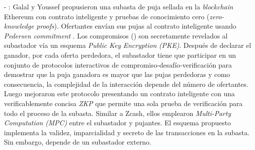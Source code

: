     - \cite{galalyusef2018a}: Galal y Youssef propusieron una subasta de puja sellada en la \textit{blockchain} Ethereum con contrato 
    inteligente y pruebas de conocimiento cero (\textit{zero-knowledge proofs}). Ofertantes envían sus pujas al contrato inteligente usando
    \textit{Pedersen commitment} \parencite{pedersen1991}. Los compromisos () son secretamente revelados al subastador vía
    un esquema \textit{Public Key Encryption (PKE)}. Después de declarar el ganador, por cada oferta perdedora, el subastador tiene que
    participar en un conjunto de protocolos interactivos de compromiso-desafío-verificación para demostrar que la puja ganadora es mayor que 
    las pujas perdedoras y como consecuencia, la complejidad de la interacción depende del número de ofertantes. Luego 
    \parencite{galalyusef2018b} mejoraron este protocolo presentando un contrato inteligente con una verificablemente concisa \textit{ZKP}
    que permite una sola prueba de verificación para todo el proceso de la subasta. Similar a Zcash, ellos emplearon \textit{Multi-Party 
    Computation (MPC)} entre el subastador y pujantes. El esquema propuesto implementa la validez, imparcialidad
    y secreto de las transacciones en la subasta. Sin embargo, depende de un subastador externo.
    
    

